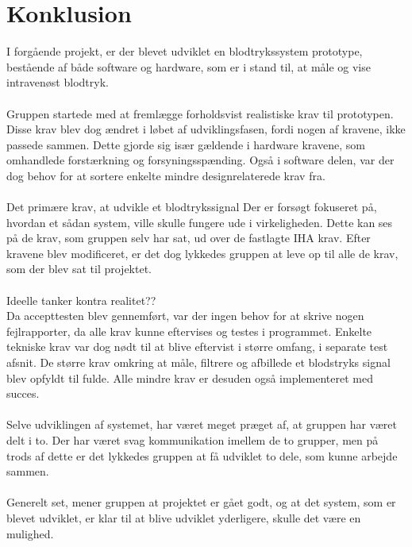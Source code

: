 \chapter{Konklusion}
I forgående projekt, er der blevet udviklet en blodtrykssystem prototype, bestående af både software og hardware, som er i stand til, at måle og vise intravenøst blodtryk. \\
\\
Gruppen startede med at fremlægge forholdsvist realistiske krav til prototypen. Disse krav blev dog ændret i løbet af udviklingsfasen, fordi nogen af kravene, ikke passede sammen. Dette gjorde sig især gældende i hardware kravene, som omhandlede forstærkning og forsyningsspænding. Også i software delen, var der dog behov for at sortere enkelte mindre designrelaterede krav fra.\\
\\
Det primære krav, at udvikle et blodtrykssignal 
Der er forsøgt fokuseret på, hvordan et sådan system, ville skulle fungere ude i virkeligheden. Dette kan ses på de krav, som gruppen selv har sat, ud over de fastlagte IHA krav. Efter kravene blev modificeret, er det dog lykkedes gruppen at leve op til alle de krav, som der blev sat til projektet. \\
\\
Ideelle tanker kontra realitet??\\

Da accepttesten blev gennemført, var der ingen behov for at skrive nogen fejlrapporter, da alle krav kunne eftervises og testes i programmet. Enkelte tekniske krav var dog nødt til at blive eftervist i større omfang, i separate test afsnit. De større krav omkring at måle, filtrere og afbillede et blodstryks signal blev opfyldt til fulde. Alle mindre krav er desuden også implementeret med succes.\\
\\
Selve udviklingen af systemet, har været meget præget af, at gruppen har været delt i to. Der har været svag kommunikation imellem de to grupper, men på trods af dette er det lykkedes gruppen at få udviklet to dele, som kunne arbejde sammen. \\
\\
Generelt set, mener gruppen at projektet er gået godt, og at det system, som er blevet udviklet, er klar til at blive udviklet yderligere, skulle det være en mulighed. \\
\\
